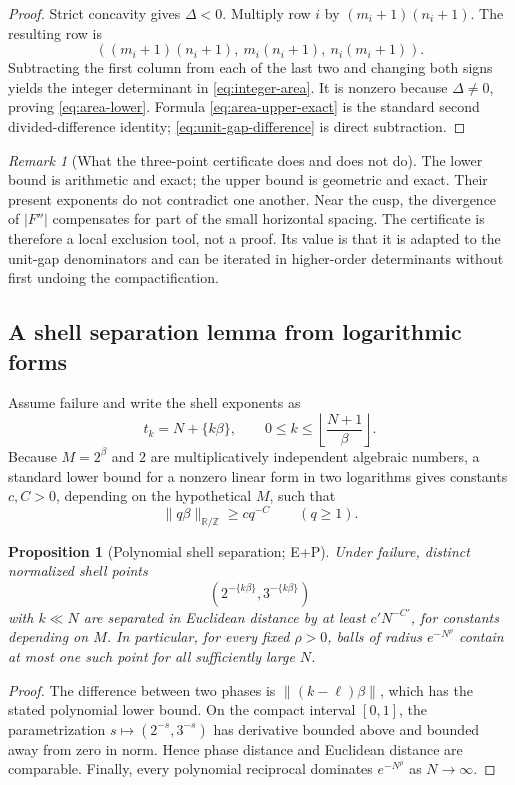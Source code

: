 \documentclass[10pt,oneside]{article}
\newtheorem{proposition}[theorem]{Proposition}
\theoremstyle{definition}
\theoremstyle{remark}
\newtheorem{remark}[theorem]{Remark}
\newcommand{\Z}{\mathbb Z}
\newcommand{\R}{\mathbb R}
\newcommand{\statusP}{\textsc{P}}
\newcommand{\statusE}{\textsc{E}}
\begin{document}
\begin{proof}
Strict concavity gives \(\Delta<0\).  Multiply row \(i\) by \((m_i+1)(n_i+1)\).  The resulting row is
\[
 ((m_i+1)(n_i+1),\ m_i(n_i+1),\ n_i(m_i+1)).
\]
Subtracting the first column from each of the last two and changing both signs yields the integer determinant in \eqref{eq:integer-area}.  It is nonzero because \(\Delta\ne0\), proving \eqref{eq:area-lower}.  Formula \eqref{eq:area-upper-exact} is the standard second divided-difference identity; \eqref{eq:unit-gap-difference} is direct subtraction.
\end{proof}

\begin{remark}[What the three-point certificate does and does not do]
The lower bound is arithmetic and exact; the upper bound is geometric and exact.  Their present exponents do not contradict one another.  Near the cusp, the divergence of \(|F''|\) compensates for part of the small horizontal spacing.  The certificate is therefore a local exclusion tool, not a proof.  Its value is that it is adapted to the unit-gap denominators and can be iterated in higher-order determinants without first undoing the compactification.
\end{remark}

\subsection{A shell separation lemma from logarithmic forms}
Assume failure and write the shell exponents as
\[
 t_k=N+\{k\beta\},
 \qquad
 0\le k\le\left\lfloor\frac{N+1}{\beta}\right\rfloor.
\]
Because \(M=2^\beta\) and \(2\) are multiplicatively independent algebraic numbers, a standard lower bound for a nonzero linear form in two logarithms \cite{BakerWustholz2007} gives constants \(c,C>0\), depending on the hypothetical \(M\), such that
\[
 \|q\beta\|_{\R/\Z}\ge c q^{-C}
 \qquad(q\ge1).
\]

\begin{proposition}[Polynomial shell separation; \statusE+\statusP]
\label{prop:shell-separation}
Under failure, distinct normalized shell points
\[
 (2^{-\{k\beta\}},3^{-\{k\beta\}})
\]
with \(k\ll N\) are separated in Euclidean distance by at least \(c'N^{-C'}\), for constants depending on \(M\).  In particular, for every fixed \(\rho>0\), balls of radius \(e^{-N^\rho}\) contain at most one such point for all sufficiently large \(N\).
\end{proposition}

\begin{proof}
The difference between two phases is \(\|(k-\ell)\beta\|\), which has the stated polynomial lower bound.  On the compact interval \([0,1]\), the parametrization \(s\mapsto(2^{-s},3^{-s})\) has derivative bounded above and bounded away from zero in norm.  Hence phase distance and Euclidean distance are comparable.  Finally, every polynomial reciprocal dominates \(e^{-N^\rho}\) as \(N\to\infty\).
\end{proof}
\end{document}
